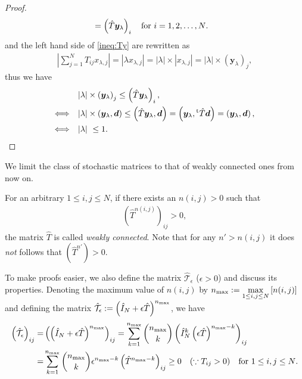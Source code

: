 \begin{proof}
\begin{align}
	&=\left(\hat{T}\bm{y}_{\lambda}\right)_{i}\quad\text{\text{for $i=1,2,\dots,N$}}\label{ineq:Ty}.
	\end{align}
	and the left hand side of \eqref{ineq:Ty} are rewritten as
	\begin{align}
	|\sum_{j=1}^{N}T_{ij}x_{\lambda,j}| = |\lambda x_{\lambda,j}| = |\lambda|\times |x_{\lambda,j}| = |\lambda|\times \left(\bm{y}_{\lambda}\right)_{j},
	\end{align}
	thus we have
	\begin{align}
	& |\lambda|\times \left(\bm{y}_{\lambda}\right)_{j} \leq \left(\hat{T}\bm{y}_{\lambda}\right)_{i},\\
	\Longleftrightarrow \quad& |\lambda|\times \left(\bm{y}_{\lambda},\bm{d}\right) \leq \left(\hat{T}\bm{y}_{\lambda},\bm{d}\right) = \left(\bm{y}_{\lambda},{}^{\rm t}\hat{T}\bm{d}\right) = \left(\bm{y}_{\lambda},\bm{d}\right), \\
	\Longleftrightarrow \quad& |\lambda| \leq 1.
	\end{align}
\end{proof}

We limit the class of stochastic matrices to that of weakly connected ones from now on.
\begin{definition}
	For an arbitrary $1\leq i,j\leq N$, if there exists an $n(i,j)>0$ such that
	\begin{align}
	\left(\hat{T}^{n(i,j)}\right)_{ij}>0,
	\end{align}
	the matrix $\hat{T}$ is called \textit{weakly connected}. Note that for any $n'>n(i,j)$ it does \textit{not} follows that $\left(\hat{T}^{n'}\right)>0$.
\end{definition}

To make proofs easier, we also define the matrix $\hat{\mathcal{T}}_{\epsilon}$ ($\epsilon>0$) and discuss its properties. Denoting the maximum value of $n(i,j)$ by $\displaystyle n_{\rm max}:=\max_{1\leq i,j\leq N}\left[n(i,j)\right]$ and defining the matrix $\hat{\mathcal{T}}_{\epsilon}:=\left(\hat{I}_{N}+\epsilon \hat{T}\right)^{n_{\rm max}}$, we have
	\begin{align}
	\left(\hat{\mathcal{T}}_{\epsilon}\right)_{ij} =& \left(\left(\hat{I}_{N}+\epsilon \hat{T}\right)^{n_{\rm max}}\right)_{ij} = \sum_{k=1}^{n_{\rm max}}\binom{n_{\rm max}}{k}\left({\hat{I}_{N}}^{k}\left(\epsilon \hat{T}\right)^{n_{\rm max}-k}\right)_{ij}\\
	=& \sum_{k=1}^{n_{\rm max}}\binom{n_{\rm max}}{k}\epsilon^{n_{\rm max}-k}\left(\hat{T}^{n_{\rm max}-k}\right)_{ij} \geq 0 \quad(\because T_{ij}>0)\quad\text{for $1\leq i,j\leq N$}.
	\end{align}

